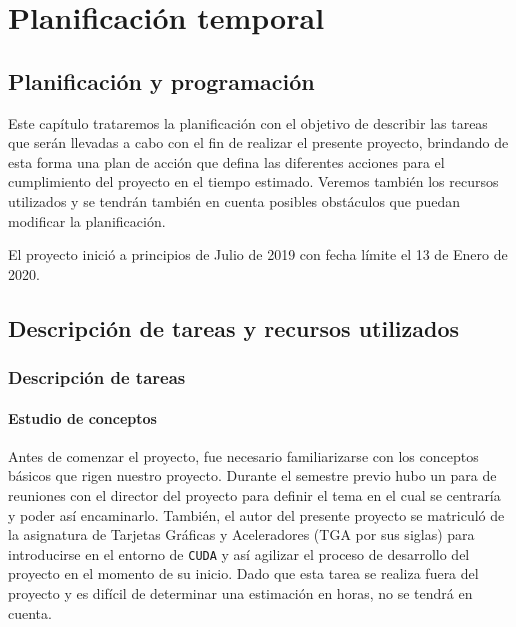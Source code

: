 \documentclass[titlepage,12pt]{report}
\begin{document}
\iftrue

\newpage
\tableofcontents*
\fi

\newpage

\chapter{Planificación temporal}

\section{Planificación y programación}

Este capítulo trataremos la planificación con el objetivo de describir las tareas que serán llevadas a cabo con el fin de realizar el presente proyecto, brindando de esta forma una plan de acción que defina las diferentes acciones para el cumplimiento del proyecto en el tiempo estimado. Veremos también los recursos utilizados y se tendrán también en cuenta posibles obstáculos que puedan modificar la planificación.

El proyecto inició a principios de Julio de 2019 con fecha límite el 13 de Enero de 2020.

\section{Descripción de tareas y recursos utilizados}

\subsection{Descripción de tareas}

\subsubsection{Estudio de conceptos}

Antes de comenzar el proyecto, fue necesario familiarizarse con los conceptos básicos que rigen nuestro proyecto. Durante el semestre previo hubo un para de reuniones con el director del proyecto para definir el tema en el cual se centraría y poder así encaminarlo. También, el autor del presente proyecto se matriculó de la asignatura de Tarjetas Gráficas y Aceleradores (TGA por sus siglas) para introducirse en el entorno de \texttt{CUDA} y así agilizar el proceso de desarrollo del proyecto en el momento de su inicio. Dado que esta tarea se realiza fuera del proyecto y es difícil de determinar una estimación en horas, no se tendrá en cuenta.
\end{document}
